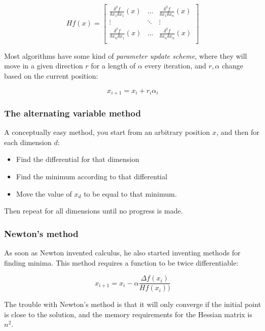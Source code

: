 \begin{description}
    \[
      Hf(x) = \begin{bmatrix}
        \frac{\delta^2 f}{\delta x_1 \delta x_1}(x) & \dots &
          \frac{\delta^2 f}{\delta x_1 \delta x_n}(x)\\
        \vdots & \ddots & \vdots\\
        \frac{\delta^2 f}{\delta x_n \delta x_1}(x) & \dots &
          \frac{\delta^2 f}{\delta x_n \delta x_n}(x)\\
      \end{bmatrix}
    \]

    Most algorithms have some kind of \textit{parameter update scheme}, where
    they will move in a given direction $r$ for a length of $\alpha$ every
    iteration,  and $r, \alpha$ change based on the current position:

    \[
      x_{i+1} = x_i + r_i\alpha_i
    \]

    \subsubsection{The alternating variable method}

    A conceptually easy method, you start from an arbitrary position $x$, and
    then for each dimension $d$:

    \begin{itemize}
      \item Find the differential for that dimension
      \item Find the minimum according to that differential
      \item Move the value of $x_d$ to be equal to that minimum.
    \end{itemize}

    Then repeat for all dimensions until no progress is made.


    \subsubsection{Newton's method}

    As soon as Newton invented calculus, he also started inventing methods for
    finding minima. This method requires a function to be twice differentiable:

    \[
      x_{i+1} = x_i - \alpha\frac{\Delta f(x_i)}{Hf(x_i))}
    \]


    The trouble with Newton's method is that it will only converge if the
    initial point is close to the solution, and the memory requirements for the
    Hessian matrix is $n^2$.


\end{description}

